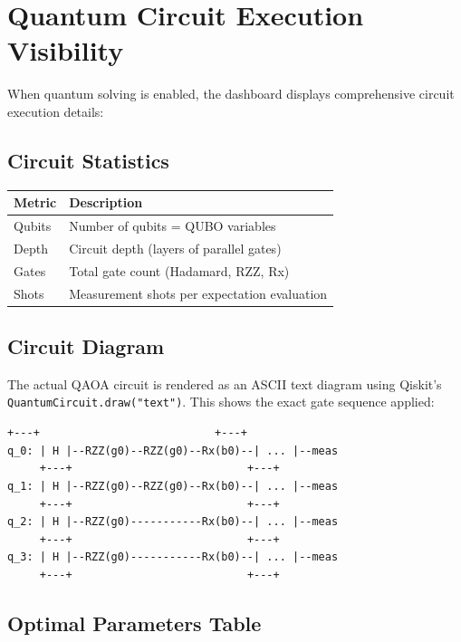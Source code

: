\documentclass[11pt,a4paper]{article}
\begin{document}
\section{Quantum Circuit Execution Visibility}
\label{sec:circuit_viz}

When quantum solving is enabled, the dashboard displays comprehensive circuit execution details:

\subsection{Circuit Statistics}

\begin{center}
\begin{tabular}{ll}
  \toprule
  \textbf{Metric} & \textbf{Description} \\
  \midrule
  Qubits & Number of qubits = QUBO variables \\
  Depth & Circuit depth (layers of parallel gates) \\
  Gates & Total gate count (Hadamard, RZZ, Rx) \\
  Shots & Measurement shots per expectation evaluation \\
  \bottomrule
\end{tabular}
\end{center}

\subsection{Circuit Diagram}

The actual QAOA circuit is rendered as an ASCII text diagram using Qiskit's \texttt{QuantumCircuit.draw("text")}. This shows the exact gate sequence applied:

\begin{lstlisting}[title={\textbf{Example}: 4-qubit QAOA circuit (p=2)}]
     +---+                           +---+
q_0: | H |--RZZ(g0)--RZZ(g0)--Rx(b0)--| ... |--meas
     +---+                           +---+
q_1: | H |--RZZ(g0)--RZZ(g0)--Rx(b0)--| ... |--meas
     +---+                           +---+
q_2: | H |--RZZ(g0)-----------Rx(b0)--| ... |--meas
     +---+                           +---+
q_3: | H |--RZZ(g0)-----------Rx(b0)--| ... |--meas
     +---+                           +---+
\end{lstlisting}

\subsection{Optimal Parameters Table}
\end{document}
